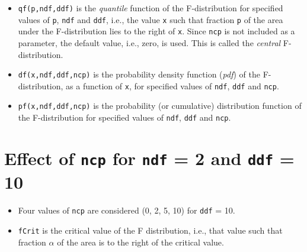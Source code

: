 \documentclass[]{book}
\providecommand{\tightlist}{%
  \setlength{\itemsep}{0pt}\setlength{\parskip}{0pt}}
\begin{document}
\begin{itemize}
\item
  \texttt{qf(p,ndf,ddf)} is the \emph{quantile} function of the F-distribution for specified values of \texttt{p}, \texttt{ndf} and \texttt{ddf}, i.e., the value \texttt{x} such that fraction \texttt{p} of the area under the F-distribution lies to the right of \texttt{x}. Since \texttt{ncp} is not included as a parameter, the default value, i.e., zero, is used. This is called the \emph{central} F-distribution.
\item
  \texttt{df(x,ndf,ddf,ncp)} is the probability density function (\emph{pdf}) of the F-distribution, as a function of \texttt{x}, for specified values of \texttt{ndf}, \texttt{ddf} and \texttt{ncp}.
\item
  \texttt{pf(x,ndf,ddf,ncp)} is the probability (or cumulative) distribution function of the F-distribution for specified values of \texttt{ndf}, \texttt{ddf} and \texttt{ncp}.
\end{itemize}

\hypertarget{effect-of-ncp-for-ndf-2-and-ddf-10}{%
\section{\texorpdfstring{Effect of \texttt{ncp} for \texttt{ndf} = 2 and \texttt{ddf} = 10}{Effect of ncp for ndf = 2 and ddf = 10}}\label{effect-of-ncp-for-ndf-2-and-ddf-10}}

\begin{itemize}
\tightlist
\item
  Four values of \texttt{ncp} are considered (0, 2, 5, 10) for \texttt{ddf} = 10.
\item
  \texttt{fCrit} is the critical value of the F distribution, i.e., that value such that fraction \(\alpha\) of the area is to the right of the critical value.
\end{itemize}
\end{document}
